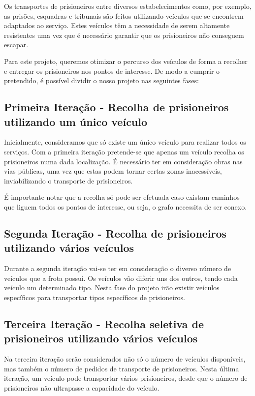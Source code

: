 \documentclass[article, a4paper, 12pt, oneside]{memoir}
\begin{document}
Os transportes de prisioneiros entre diversos estabelecimentos como, por exemplo, as prisões, esquadras e tribunais são feitos utilizando veículos que se encontrem adaptados ao serviço. Estes veículos têm a necessidade de serem altamente resistentes uma vez que é necessário garantir que os prisioneiros não conseguem escapar.

Para este projeto, queremos otimizar o percurso dos veículos de forma a recolher e entregar os prisioneiros nos pontos de interesse. De modo a cumprir o pretendido, é possível dividir o nosso projeto nas seguintes fases:

\subsection{Primeira Iteração - Recolha de prisioneiros utilizando um único veículo}
	Inicialmente, consideramos que só existe um único veículo para realizar todos os serviços.
	Com a primeira iteração pretende-se que apenas um veículo recolha os prisioneiros numa dada localização.
	É necessário ter em consideração obras nas vias públicas, uma vez que estas podem tornar certas zonas inacessíveis, inviabilizando o transporte de prisioneiros. 
	
	É importante notar que a recolha só pode ser efetuada caso existam caminhos que liguem todos os pontos de interesse, ou seja, o grafo necessita de ser conexo.

\subsection{Segunda Iteração - Recolha de prisioneiros utilizando vários veículos}
	Durante a segunda iteração vai-se ter em consideração o diverso número de veículos que a frota possui. Os veículos vão diferir uns dos outros, tendo cada veículo um determinado tipo. Nesta fase do projeto irão existir veículos específicos para transportar tipos específicos de prisioneiros.

\subsection{Terceira Iteração - Recolha seletiva de prisioneiros utilizando vários veículos}
	Na terceira iteração serão considerados não só o número de veículos disponíveis, mas também o número de pedidos de transporte de prisioneiros. Nesta última iteração, um veículo pode transportar vários prisioneiros, desde que o número de prisioneiros não ultrapasse a capacidade do veículo.
\end{document}

